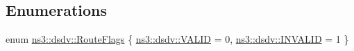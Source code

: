 \subsection*{Enumerations}
\begin{DoxyCompactItemize}
\item 
enum \hyperlink{namespacens3_1_1dsdv_aa1c39555b993cc6f56f2c8c6c31e2c3b}{ns3\+::dsdv\+::\+Route\+Flags} \{ \hyperlink{namespacens3_1_1dsdv_aa1c39555b993cc6f56f2c8c6c31e2c3baf2cbf3d202d1c7338230c662e6822e65}{ns3\+::dsdv\+::\+V\+A\+L\+ID} = 0, 
\hyperlink{namespacens3_1_1dsdv_aa1c39555b993cc6f56f2c8c6c31e2c3ba2dbd3930b34b55bfe8d1a3617eabb9de}{ns3\+::dsdv\+::\+I\+N\+V\+A\+L\+ID} = 1
 \}
\end{DoxyCompactItemize}
